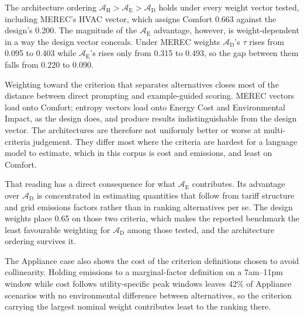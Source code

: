 The architecture ordering
$\mathcal{A}_{\text{H}} > \mathcal{A}_{\text{E}} > \mathcal{A}_{\text{D}}$ holds
under every weight vector tested, including MEREC's HVAC vector, which assigns
Comfort 0.663 against the design's 0.200. The magnitude of the
$\mathcal{A}_{\text{E}}$ advantage, however, is weight-dependent in a way the
design vector conceals. Under MEREC weights $\mathcal{A}_{\text{D}}$'s $\tau$
rises from 0.095 to 0.403 while $\mathcal{A}_{\text{E}}$'s rises only from
0.315 to 0.493, so the gap between them falls from 0.220 to 0.090.



\FloatBarrier

Weighting toward the criterion that separates alternatives closes most of the
distance between direct prompting and example-guided scoring. MEREC vectors
load onto Comfort; entropy vectors load onto Energy Cost and Environmental
Impact, as the design does, and produce results indistinguishable from the
design vector. The architectures are therefore not uniformly better or worse at
multi-criteria judgement. They differ most where the criteria are hardest for a
language model to estimate, which in this corpus is cost and emissions, and
least on Comfort.

That reading has a direct consequence for what
$\mathcal{A}_{\text{E}}$ contributes. Its advantage over
$\mathcal{A}_{\text{D}}$ is concentrated in estimating quantities that follow
from tariff structure and grid emissions factors rather than in ranking
alternatives per se. The design weights place 0.65 on those two criteria, which
makes the reported benchmark the least favourable weighting for
$\mathcal{A}_{\text{D}}$ among those tested, and the architecture ordering
survives it.

The Appliance case also shows the cost of the criterion definitions chosen to
avoid collinearity. Holding emissions to a marginal-factor definition on a
7am--11pm window while cost follows utility-specific peak windows leaves 42\%
of Appliance scenarios with no environmental difference between alternatives,
so the criterion carrying the largest nominal weight contributes least to the
ranking there.



